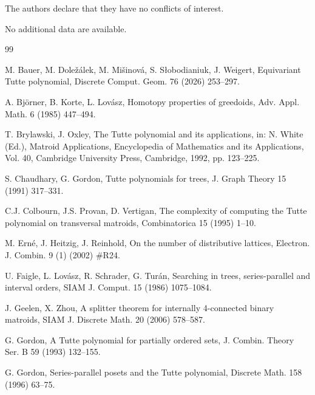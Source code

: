 \documentclass[11pt,a4paper]{article}
\begin{document}

The authors declare that they have no conflicts of interest.


No additional data are available.

\begin{thebibliography}{99}

M. Bauer, M. Dole\v{z}\'alek, M. Mi\v{s}inov\'a, S. S{\l}obodianiuk, J. Weigert, Equivariant Tutte polynomial, Discrete Comput. Geom. 76 (2026) 253--297.

A. Bj\"orner, B. Korte, L. Lov\'asz, Homotopy properties of greedoids, Adv. Appl. Math. 6 (1985) 447--494.

T. Brylawski, J. Oxley, The Tutte polynomial and its applications, in: N. White (Ed.), Matroid Applications,
Encyclopedia of Mathematics and its Applications, Vol. 40, Cambridge University Press, Cambridge, 1992, pp. 123--225.

S. Chaudhary, G. Gordon, Tutte polynomials for trees, J. Graph Theory 15 (1991) 317--331.

C.J. Colbourn, J.S. Provan, D. Vertigan, The complexity of computing the Tutte polynomial on transversal matroids,
Combinatorica 15 (1995) 1--10.

M. Ern\'e, J. Heitzig, J. Reinhold, On the number of distributive lattices, Electron. J. Combin. 9 (1) (2002) \#R24.

U. Faigle, L. Lov\'asz, R. Schrader, G. Tur\'an, Searching in trees, series-parallel and interval orders,
SIAM J. Comput. 15 (1986) 1075--1084.

J. Geelen, X. Zhou, A splitter theorem for internally 4-connected binary matroids, SIAM J. Discrete Math. 20 (2006) 578--587.

G. Gordon, A Tutte polynomial for partially ordered sets, J. Combin. Theory Ser. B 59 (1993) 132--155.

G. Gordon, Series-parallel posets and the Tutte polynomial, Discrete Math. 158 (1996) 63--75.



\end{thebibliography}
\end{document}
